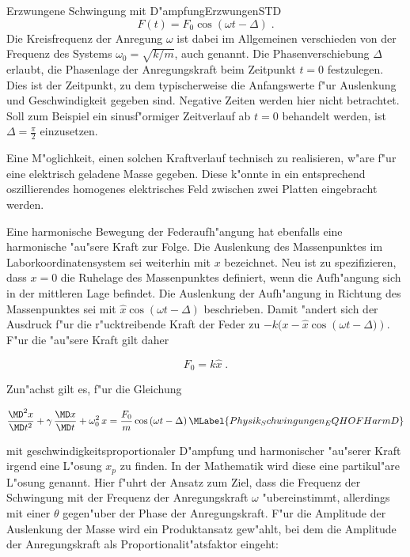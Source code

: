 \begin{MXContent}{Erzwungene Schwingung mit D"ampfung}{Erzwungen}{STD}
\begin{equation}
  F(t) = F_0 \cos\left( \omega t - \Delta \right)\; .
\end{equation}
Die Kreisfrequenz der Anregung $\omega$ ist dabei im Allgemeinen verschieden von der  Frequenz des Systems $\omega_0 = \sqrt{k / m}$, auch  genannt. Die Phasenverschiebung $\Delta$ erlaubt, die Phasenlage der Anregungskraft beim Zeitpunkt $t=0$ festzulegen. Dies ist der Zeitpunkt, zu dem typischerweise die Anfangswerte f"ur Auslenkung und Geschwindigkeit gegeben sind. Negative Zeiten werden hier nicht betrachtet. Soll zum Beispiel ein sinusf"ormiger Zeitverlauf ab $t=0$ behandelt werden, ist $\Delta = \frac{\pi}{2}$ einzusetzen.

Eine M"oglichkeit, einen solchen Kraftverlauf technisch zu realisieren, w"are f"ur eine elektrisch geladene Masse gegeben. Diese k"onnte in ein entsprechend oszillierendes homogenes elektrisches Feld zwischen zwei Platten eingebracht werden. 

Eine harmonische Bewegung der Federaufh"angung hat ebenfalls eine harmonische "au"sere Kraft zur Folge. Die Auslenkung des Massenpunktes im Laborkoordinatensystem sei weiterhin mit $x$ bezeichnet. Neu ist zu spezifizieren, dass $x=0$ die Ruhelage des Massenpunktes definiert, wenn die Aufh"angung sich in der mittleren Lage befindet. Die Auslenkung der Aufh"angung in Richtung des Massenpunktes sei mit $\hat{x}\cos\left( \omega t - \Delta\right)$ beschrieben. Damit "andert sich der Ausdruck f"ur die r"ucktreibende Kraft der Feder zu $-k(x-\hat{x}\cos\left(\omega t - \Delta)\right)$. F"ur die "au"sere Kraft gilt daher

\begin{equation}
  F_0 = k\hat{x}\; .
\end{equation}

Zun"achst gilt es, f"ur die Gleichung 

\begin{equation}
  \frac{\MD^2 x }{\MD t^2} + \gamma \, \frac{\MD x }{\MD t} + \omega_0^2\,x = \frac{F_0}{m} \cos\left( \omega t - \Delta\right)
  \MLabel{Physik_Schwingungen_EQHOFHarmD}
\end{equation}

mit geschwindigkeitsproportionaler D"ampfung und harmonischer "au"serer Kraft irgend eine L"osung $x_p$ zu finden. In der Mathematik wird diese eine partikul"are L"osung genannt. Hier f"uhrt der Ansatz zum Ziel, dass die Frequenz der Schwingung mit der Frequenz der Anregungskraft $\omega$ "ubereinstimmt, allerdings mit einer  $\theta$ gegen"uber der Phase der Anregungskraft. F"ur die Amplitude der Auslenkung der Masse wird ein Produktansatz gew"ahlt, bei dem die Amplitude der Anregungskraft als Proportionalit"atsfaktor eingeht:


\end{MXContent}
